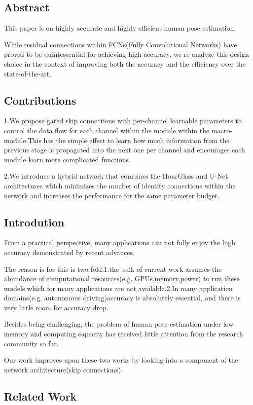 \documentclass[11pt]{article}
\begin{document}
\subsection{Abstract}
This paper is on highly accurate and highly efficient human pose estimation.

While residual connections within FCNs(Fully Convolutional Networks) have proved to be quintessential for achieving high accuracy, we re-analyze this design choice in the context of improving both the accuracy and the efficiency over the state-of-the-art.

\subsection{Contributions}
1.We propose gated skip connections with per-channel learnable parameters to control the data flow for each channel within the module within the macro-module.This has the simple effect to learn how much information from the previous stage is propagated into the next one per channel and encourages each module learn more complicated functions

2.We introduce a hybrid network that combines the HourGlass and U-Net architectures
which minimizes the number of identity connections within the network and increases the performance for the same parameter budget.

\subsection{Introdution}
From a practical perspective, many applications can not fully enjoy the high accuracy demonstrated by recent advances.

The reason is for this is two fold:1.the bulk of current work assumes the abundance of computational resources(e.g. GPUs,memory,power) to run these models which for many applications are not available.2.In many application domains(e.g. autonomous driving)accuracy is absolutely essential, and there is very little room for accuracy drop.

Besides being challenging, the problem of human pose estimation under low memory and computing capacity has received little attention from the research community so far.

Our work improves upon these two works by looking into a component of the network architecture(skip connections)
\subsection{Related Work}
\end{document}
